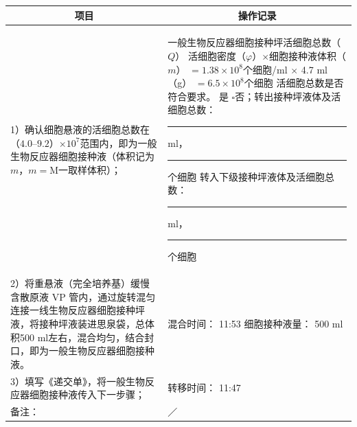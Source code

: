 \documentclass[UTF8,10pt,a4paper,fontset=fandol]{ctexart}
\newcommand{\fieldvalue}[1]{#1}
\newcommand{\handwritten}[1]{#1}
\begin{document}
\begin{tabularx}{\textwidth}{|p{}|X|}
\hline
\multicolumn{1}{|c|}{项目} & \multicolumn{1}{c|}{操作记录} \\
\hline
1）确认细胞悬液的活细胞总数在（$4.0$--$9.2$）$\times10^{7}$范围内，即为一般生物反应器细胞接种液（体积记为$m$，$m=$M一取样体积）； &
一般生物反应器细胞接种坪活细胞总数（$Q$）\newline
活细胞密度（$\varphi$）$\times$细胞接种液体积（$m$）\newline
%
\fieldvalue{$=1.38\times10^{8}$}个细胞/ml $\times$ 
%
\fieldvalue{4.7} ml（g）\newline
%
\fieldvalue{$=6.5\times10^{8}$}个细胞\newline
活细胞总数是否符合要求。\newline
%
\fieldvalue{\checkmark 是}\newline
$\square$否；转出接种坪液体及活细胞总数：\newline
\hspace{1em}\rule{3cm}{0.4pt} ml，\rule{3cm}{0.4pt} 个细胞\newline
转入下级接种坪液体及活细胞总数：\newline
\hspace{1em}\rule{3cm}{0.4pt} ml，\rule{3cm}{0.4pt} 个细胞
\\
\hline
2）将重悬液（完全培养基）缓慢含散原液 VP 管内，通过旋转混匀连接一线生物反应器细胞接种坪液，将接种坪液装进思泉袋，总体积500 ml左右，混合均匀，结合封口，即为一般生物反应器细胞接种液。 &
%
混合时间：
\fieldvalue{\handwritten{11:53}}\newline
细胞接种液量：
%
\fieldvalue{500} ml
\\
\hline
3）填写《递交单》，将一般生物反应器细胞接种液传入下一步骤； &
转移时间：
%
\fieldvalue{\handwritten{11:47}}
\\
\hline
备注： &
\fieldvalue{\handwritten{／}}
\\
\hline
\end{tabularx}
\end{document}
